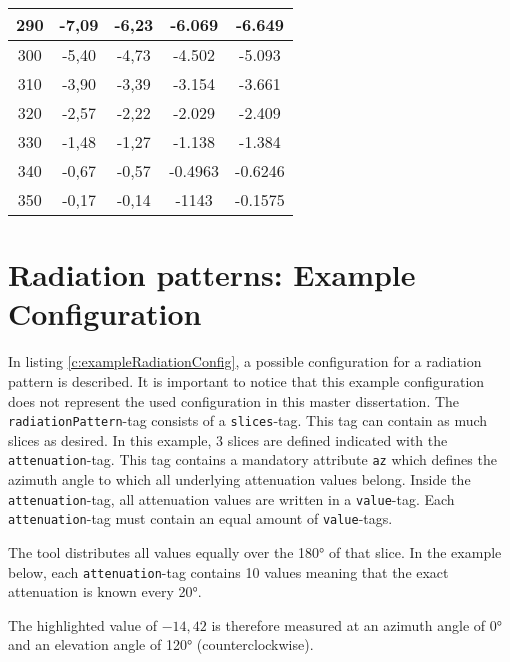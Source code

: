 \begin{table*}[!ht]
\begin{tabular}{|c|c|c|c|c|}
290 & -7,09 & -6,23 & -6.069 & -6.649 \\ \hline
300 & -5,40 & -4,73 & -4.502 & -5.093 \\ \hline
310 & -3,90 & -3,39 & -3.154 & -3.661 \\ \hline
320 & -2,57 & -2,22 & -2.029 & -2.409 \\ \hline
330 & -1,48 & -1,27 & -1.138 & -1.384 \\ \hline
340 & -0,67 & -0,57 & -0.4963 & -0.6246 \\ \hline
350 & -0,17 & -0,14 & -1143 & -0.1575 \\ \hline
\end{tabular}
\label{tab:datasheetRadiation}
\end{table*}



\chapter{Radiation patterns: Example Configuration}
\label{ch:radpatexampleconfig}

In listing \ref{c:exampleRadiationConfig}, a possible configuration for a radiation pattern is described.
It is important to notice that this example configuration does not represent the used configuration in this master dissertation.
The \verb|radiationPattern|-tag consists of a \verb|slices|-tag. This tag can contain as much slices as desired.
In this example, 3 slices are defined indicated with the \verb|attenuation|-tag. This tag contains a mandatory attribute \verb|az| 
which defines the azimuth angle to which all underlying attenuation values belong.
Inside the \verb|attenuation|-tag, all attenuation values are written in a \verb|value|-tag. Each \verb|attenuation|-tag must contain 
an equal amount of \verb|value|-tags.

The tool distributes all values equally over the \ang{180} of that slice. In the example below, each \verb|attenuation|-tag contains 10 values
meaning that the exact attenuation is known every \ang{20}.

The highlighted value of $-14,42$ is therefore measured at an azimuth angle of \ang{0} and an elevation angle of \ang{120} (counterclockwise).

